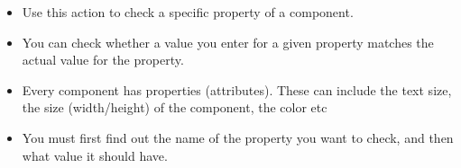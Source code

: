 \begin{itemize}
\item Use this action to check a specific property of a component. 
\item You can check whether a value you enter for a given property matches the actual value for the property.
\item Every component has properties (attributes). These can include the text size, the size (width/height) of the component, the color etc
\item You must first find out the name of the property you want to check, and then what value it should have. 
\end{itemize}
